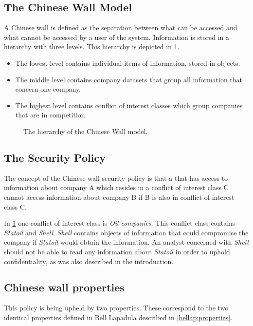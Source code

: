 \subsection*{The Chinese Wall Model}
A Chinese wall is defined as the separation between what can be accessed and what cannot be accessed by a user of the system.
Information is stored in a hierarchy with three levels. 
This hierarchy is depicted in \cref{china:hierarchy}.

\begin{itemize}
	\item The lowest level contains individual items of information, stored in objects.
	\item The middle level contains company datasets that group all information that concern one company. 
	\item The highest level contains conflict of interest classes which group companies that are in competition.
\end{itemize}

\begin{figure}[h]
  \resizebox{\textwidth}{!}{
	}
	\caption{The hierarchy of the Chinese Wall model.}
	\label{china:hierarchy}
\end{figure}

\subsection{The Security Policy}
The concept of the Chinese wall security policy is that a \principal{} that has access to information about company A which resides in a conflict of interest class C cannot access information about company B if B is also in conflict of interest class C.

In \cref{china:hierarchy} one conflict of interest class is \emph{Oil companies}.
This conflict class contains \emph{Statoil} and \emph{Shell}. 
\emph{Shell} contains objects of information that could compromise the company if \emph{Statoil} would obtain the information.
An analyst concerned with \emph{Shell} should not be able to read any information about \emph{Statoil} in order to uphold confidentiality, as was also described in the introduction.

\subsection{Chinese wall properties}
This policy is being upheld by two properties.
These correspond to the two identical properties defined in Bell Lapadula described in \cref{bellap:properties}.


